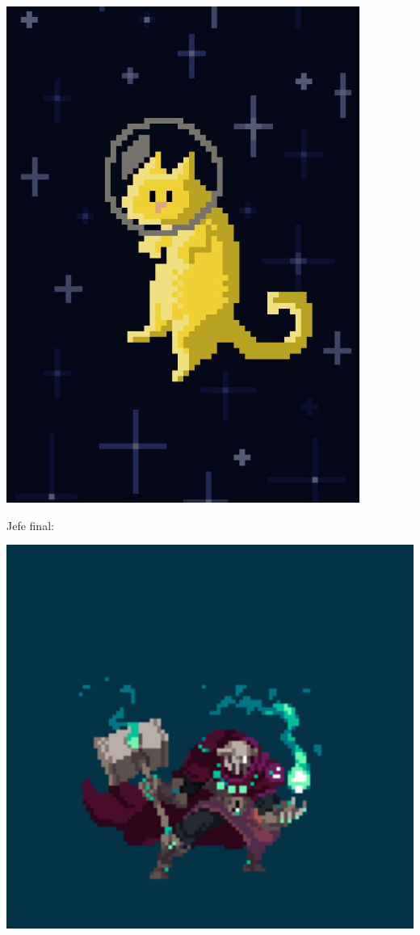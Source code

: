\documentclass{article}
\begin{document}
\includegraphics[scale=0.30]{Ideación/Images/enemigo2.png}

Jefe final: 



\includegraphics[scale=0.28]{Ideación/Images/jefe_final.jpg}
\end{document}

